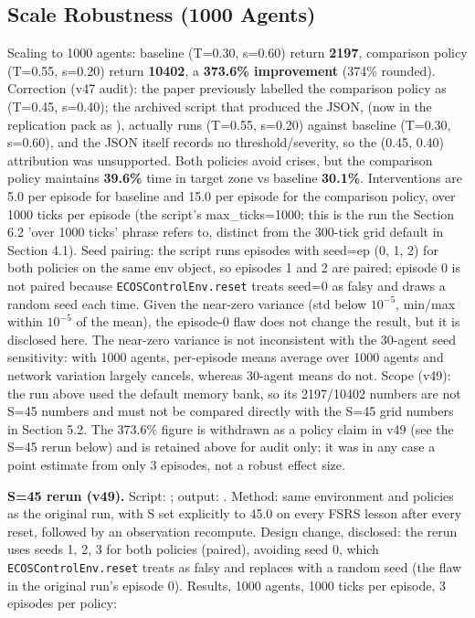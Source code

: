 \documentclass[11pt]{article}
\begin{document}
\subsection{Scale Robustness (1000 Agents)}
Scaling to 1000 agents: baseline (T=0.30, s=0.60) return \textbf{2197}, comparison policy (T=0.55, s=0.20) return \textbf{10402}, a \textbf{373.6\% improvement} (374\% rounded). Correction (v47 audit): the paper previously labelled the comparison policy as (T=0.45, s=0.40); the archived script that produced the JSON,  (now in the replication pack as ), actually runs (T=0.55, s=0.20) against baseline (T=0.30, s=0.60), and the JSON itself records no threshold/severity, so the (0.45, 0.40) attribution was unsupported. Both policies avoid crises, but the comparison policy maintains \textbf{39.6\%} time in target zone vs baseline \textbf{30.1\%}. Interventions are 5.0 per episode for baseline and 15.0 per episode for the comparison policy, over 1000 ticks per episode (the script's max\_ticks=1000; this is the run the Section 6.2 'over 1000 ticks' phrase refers to, distinct from the 300-tick grid default in Section 4.1). Seed pairing: the script runs episodes with seed=ep (0, 1, 2) for both policies on the same env object, so episodes 1 and 2 are paired; episode 0 is not paired because \texttt{ECOSControlEnv.reset} treats seed=0 as falsy and draws a random seed each time. Given the near-zero variance (std below $10^{-5}$, min/max within $10^{-5}$ of the mean), the episode-0 flaw does not change the result, but it is disclosed here. The near-zero variance is not inconsistent with the 30-agent seed sensitivity: with 1000 agents, per-episode means average over 1000 agents and network variation largely cancels, whereas 30-agent means do not. Scope (v49): the run above used the default memory bank, so its 2197/10402 numbers are not S=45 numbers and must not be compared directly with the S=45 grid numbers in Section 5.2. The 373.6\% figure is withdrawn as a policy claim in v49 (see the S=45 rerun below) and is retained above for audit only; it was in any case a point estimate from only 3 episodes, not a robust effect size.

\textbf{S=45 rerun (v49).} Script: ; output: . Method: same environment and policies as the original run, with S set explicitly to 45.0 on every FSRS lesson after every reset, followed by an observation recompute. Design change, disclosed: the rerun uses seeds 1, 2, 3 for both policies (paired), avoiding seed 0, which \texttt{ECOSControlEnv.reset} treats as falsy and replaces with a random seed (the flaw in the original run's episode 0). Results, 1000 agents, 1000 ticks per episode, 3 episodes per policy:
\end{document}
